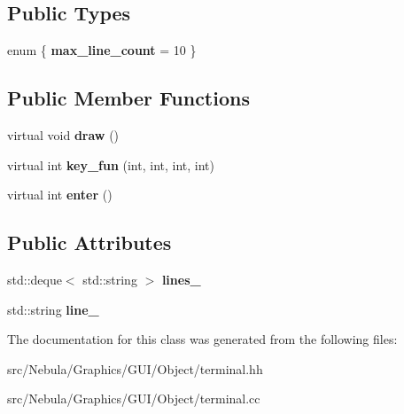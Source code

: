 \subsection*{Public Types}
\begin{DoxyCompactItemize}
\item 
enum \{ {\bfseries max\-\_\-line\-\_\-count} = 10
 \}
\end{DoxyCompactItemize}
\subsection*{Public Member Functions}
\begin{DoxyCompactItemize}
\item 
\hypertarget{classNeb_1_1gui_1_1object_1_1terminal_a18aa33c5c2715448fbc5d3d56a7fd4b5}{virtual void {\bfseries draw} ()}\label{classNeb_1_1gui_1_1object_1_1terminal_a18aa33c5c2715448fbc5d3d56a7fd4b5}

\item 
\hypertarget{classNeb_1_1gui_1_1object_1_1terminal_afafb6e54a1fac406cd62285789523600}{virtual int {\bfseries key\-\_\-fun} (int, int, int, int)}\label{classNeb_1_1gui_1_1object_1_1terminal_afafb6e54a1fac406cd62285789523600}

\item 
\hypertarget{classNeb_1_1gui_1_1object_1_1terminal_a14a48b79f63f90089a8cf74f8a31677c}{virtual int {\bfseries enter} ()}\label{classNeb_1_1gui_1_1object_1_1terminal_a14a48b79f63f90089a8cf74f8a31677c}

\end{DoxyCompactItemize}
\subsection*{Public Attributes}
\begin{DoxyCompactItemize}
\item 
\hypertarget{classNeb_1_1gui_1_1object_1_1terminal_aaa3062edc24c1ae158f94c1685c1051f}{std\-::deque$<$ std\-::string $>$ {\bfseries lines\-\_\-}}\label{classNeb_1_1gui_1_1object_1_1terminal_aaa3062edc24c1ae158f94c1685c1051f}

\item 
\hypertarget{classNeb_1_1gui_1_1object_1_1terminal_aace520ed4f87afbe4266bb5c42bdf9da}{std\-::string {\bfseries line\-\_\-}}\label{classNeb_1_1gui_1_1object_1_1terminal_aace520ed4f87afbe4266bb5c42bdf9da}

\end{DoxyCompactItemize}


The documentation for this class was generated from the following files\-:\begin{DoxyCompactItemize}
\item 
src/\-Nebula/\-Graphics/\-G\-U\-I/\-Object/terminal.\-hh\item 
src/\-Nebula/\-Graphics/\-G\-U\-I/\-Object/terminal.\-cc\end{DoxyCompactItemize}
